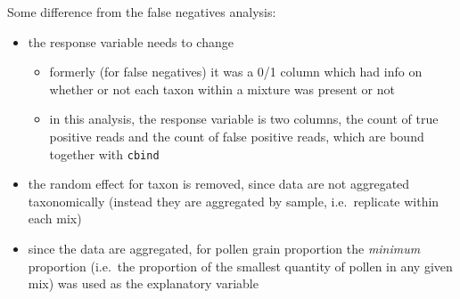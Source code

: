 \documentclass[
]{article}
\providecommand{\tightlist}{%
  \setlength{\itemsep}{0pt}\setlength{\parskip}{0pt}}
\begin{document}
Some difference from the false negatives analysis:

\begin{itemize}
\tightlist
\item
  the response variable needs to change

  \begin{itemize}
  \tightlist
  \item
    formerly (for false negatives) it was a 0/1 column which had info on
    whether or not each taxon within a mixture was present or not
  \item
    in this analysis, the response variable is two columns, the count of
    true positive reads and the count of false positive reads, which are
    bound together with \texttt{cbind}
  \end{itemize}
\item
  the random effect for taxon is removed, since data are not aggregated
  taxonomically (instead they are aggregated by sample, i.e.~replicate
  within each mix)
\item
  since the data are aggregated, for pollen grain proportion the
  \emph{minimum} proportion (i.e.~the proportion of the smallest
  quantity of pollen in any given mix) was used as the explanatory
  variable
\end{itemize}
\end{document}

